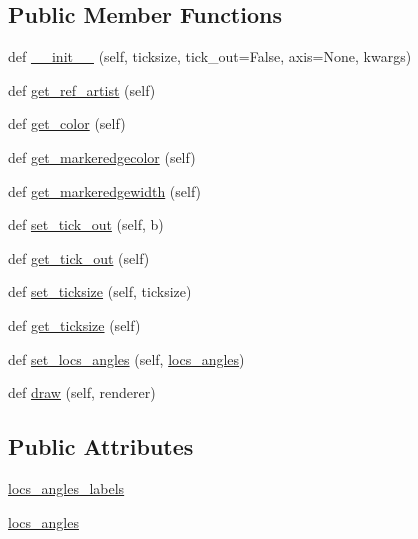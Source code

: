 \subsection*{Public Member Functions}
\begin{DoxyCompactItemize}
\item 
def \hyperlink{classaxisartist_1_1axis__artist_1_1Ticks_aa7739a17139cca6850737018cd2a71c1}{\+\_\+\+\_\+init\+\_\+\+\_\+} (self, ticksize, tick\+\_\+out=False, axis=None, kwargs)
\item 
def \hyperlink{classaxisartist_1_1axis__artist_1_1Ticks_a9fced499ca7ad5a0f5a9e6b987054cff}{get\+\_\+ref\+\_\+artist} (self)
\item 
def \hyperlink{classaxisartist_1_1axis__artist_1_1Ticks_a1180e01ac02637cbbf80198e39dc06e0}{get\+\_\+color} (self)
\item 
def \hyperlink{classaxisartist_1_1axis__artist_1_1Ticks_a0142d523adbb201739dc18e5210e97f1}{get\+\_\+markeredgecolor} (self)
\item 
def \hyperlink{classaxisartist_1_1axis__artist_1_1Ticks_ab38c012eb8725d7fd5defb480eb4a1ae}{get\+\_\+markeredgewidth} (self)
\item 
def \hyperlink{classaxisartist_1_1axis__artist_1_1Ticks_ad024ea954b97c9ae5f2b071e643e7c91}{set\+\_\+tick\+\_\+out} (self, b)
\item 
def \hyperlink{classaxisartist_1_1axis__artist_1_1Ticks_a3b3cff8e6ed4c05c0cc1d60d07a058d6}{get\+\_\+tick\+\_\+out} (self)
\item 
def \hyperlink{classaxisartist_1_1axis__artist_1_1Ticks_a920d918b32796d96a67a8feab88c9ac8}{set\+\_\+ticksize} (self, ticksize)
\item 
def \hyperlink{classaxisartist_1_1axis__artist_1_1Ticks_a01435755df08fb9a5e37cf99be9c31c5}{get\+\_\+ticksize} (self)
\item 
def \hyperlink{classaxisartist_1_1axis__artist_1_1Ticks_a2ec25c056866e46cb953bf13f04d2e5f}{set\+\_\+locs\+\_\+angles} (self, \hyperlink{classaxisartist_1_1axis__artist_1_1Ticks_a7ebbf957469b299f7f57a8e5a4f80511}{locs\+\_\+angles})
\item 
def \hyperlink{classaxisartist_1_1axis__artist_1_1Ticks_a10650ae1ff3f41154841ed69f6b26cf3}{draw} (self, renderer)
\end{DoxyCompactItemize}
\subsection*{Public Attributes}
\begin{DoxyCompactItemize}
\item 
\hyperlink{classaxisartist_1_1axis__artist_1_1Ticks_aa98517dce24735f7be0ddd45f38485c0}{locs\+\_\+angles\+\_\+labels}
\item 
\hyperlink{classaxisartist_1_1axis__artist_1_1Ticks_a7ebbf957469b299f7f57a8e5a4f80511}{locs\+\_\+angles}
\end{DoxyCompactItemize}
